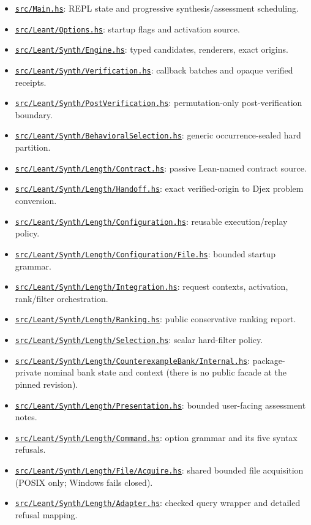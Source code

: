 \documentclass[10pt,letterpaper,oneside]{report}
\newcommand{\code}[1]{\texttt{\detokenize{#1}}}
\def\LeantCommit{494259dbd85ae2e6749246b08377f44b2f9936ac}
\def\LeantBase{https://github.com/VladimirReshetnikov/Leant/blob/\LeantCommit/}
\newcommand{\lpath}[1]{\href{\LeantBase#1}{\nolinkurl{#1}}}
\begin{document}
\begin{itemize}
\item \lpath{src/Main.hs}: REPL state and progressive synthesis/assessment scheduling.
\item \lpath{src/Leant/Options.hs}: startup flags and activation source.
\item \lpath{src/Leant/Synth/Engine.hs}: typed candidates, renderers, exact origins.
\item \lpath{src/Leant/Synth/Verification.hs}: callback batches and opaque verified receipts.
\item \lpath{src/Leant/Synth/PostVerification.hs}: permutation-only post-verification boundary.
\item \lpath{src/Leant/Synth/BehavioralSelection.hs}: generic occurrence-sealed hard partition.
\item \lpath{src/Leant/Synth/Length/Contract.hs}: passive Lean-named contract source.
\item \lpath{src/Leant/Synth/Length/Handoff.hs}: exact verified-origin to Djex problem conversion.
\item \lpath{src/Leant/Synth/Length/Configuration.hs}: reusable execution/replay policy.
\item \lpath{src/Leant/Synth/Length/Configuration/File.hs}: bounded startup grammar.
\item \lpath{src/Leant/Synth/Length/Integration.hs}: request contexts, activation, rank/filter orchestration.
\item \lpath{src/Leant/Synth/Length/Ranking.hs}: public conservative ranking report.
\item \lpath{src/Leant/Synth/Length/Selection.hs}: scalar hard-filter policy.
\item \lpath{src/Leant/Synth/Length/CounterexampleBank/Internal.hs}: package-private nominal bank state and context (there is no public \code{CounterexampleBank.hs} facade at the pinned revision).
\item \lpath{src/Leant/Synth/Length/Presentation.hs}: bounded user-facing assessment notes.
\item \lpath{src/Leant/Synth/Length/Command.hs}: \code{:synth} option grammar and its five syntax refusals.
\item \lpath{src/Leant/Synth/Length/File/Acquire.hs}: shared bounded file acquisition (POSIX only; Windows fails closed).
\item \lpath{src/Leant/Synth/Length/Adapter.hs}: checked query wrapper and detailed refusal mapping.
\end{itemize}
\end{document}
